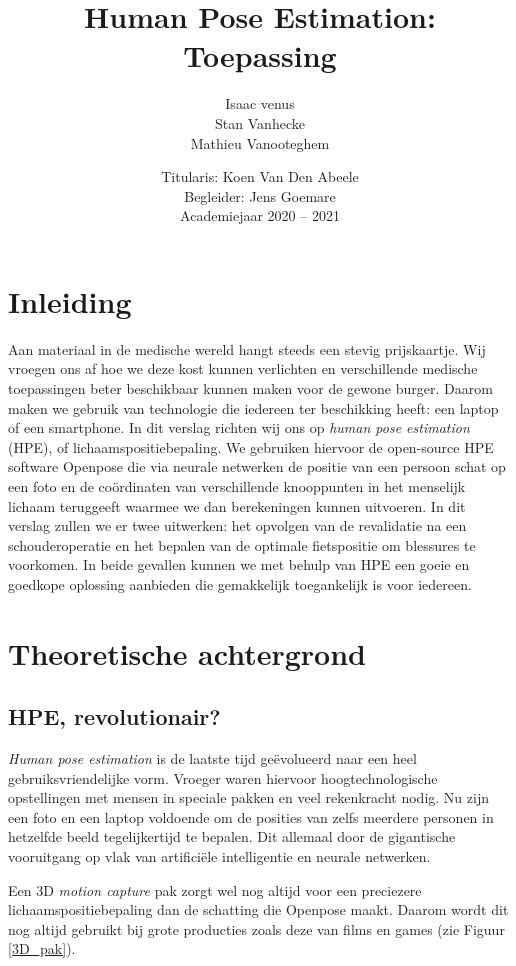 \documentclass[a4paper,twoside,kulak]{kulakreport}
\title{Human Pose Estimation:\\Toepassing}
\subtitle{}
\author{Isaac venus\\Stan Vanhecke\\Mathieu Vanooteghem}
\institute{KU Leuven Kulak, Wetenschap \& Technologie}
\date{Titularis: Koen Van Den Abeele\\Begleider: Jens Goemare\\Academiejaar 2020 -- 2021}
\begin{document}

\titlepage

\tableofcontents

\chapter*{Inleiding}
Aan materiaal in de medische wereld hangt steeds een stevig prijskaartje. Wij vroegen ons af hoe we deze kost kunnen verlichten en verschillende medische toepassingen beter beschikbaar kunnen maken voor de gewone burger. Daarom maken we gebruik van technologie die iedereen ter beschikking heeft: een laptop of een smartphone.
In dit verslag richten wij ons op \emph{human pose estimation} (HPE), of lichaamspositiebepaling. We gebruiken hiervoor de open-source HPE software Openpose die via neurale netwerken de positie van een persoon schat op een foto en de coördinaten van verschillende knooppunten in het menselijk lichaam teruggeeft waarmee we dan berekeningen kunnen uitvoeren. In dit verslag zullen we er twee uitwerken: het opvolgen van de revalidatie na een schouderoperatie en het bepalen van de optimale fietspositie om blessures te voorkomen. In beide gevallen kunnen we met behulp van HPE een goeie en goedkope oplossing aanbieden die gemakkelijk toegankelijk is voor iedereen.

\chapter{Theoretische achtergrond}
\section{HPE, revolutionair?}
\emph{Human pose estimation} is de laatste tijd geëvolueerd naar een heel gebruiksvriendelijke vorm. Vroeger waren hiervoor hoogtechnologische opstellingen met mensen in speciale pakken en veel rekenkracht nodig. Nu zijn een foto en een laptop voldoende om de posities van zelfs meerdere personen in hetzelfde beeld tegelijkertijd te bepalen. Dit allemaal door de gigantische vooruitgang op vlak van artificiële intelligentie en neurale netwerken.

Een 3D \emph{motion capture} pak zorgt wel nog altijd voor een preciezere lichaamspositiebepaling dan de schatting die Openpose maakt. Daarom wordt dit nog altijd gebruikt bij grote producties zoals deze van films en games (zie Figuur \ref{3D_pak}).
\end{document}
